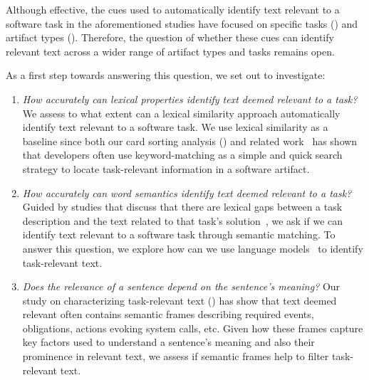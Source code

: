 Although effective, the cues used to automatically identify text relevant to a software task in the aforementioned studies have focused on specific tasks () and artifact types ().
Therefore, the question of whether these cues can identify relevant text across a wider range of artifact types and tasks remains open. 


As a first step towards answering this question, we set out to investigate:


\begin{enumerate}
    \item \textit{How accurately can lexical properties identify text deemed relevant to a task?}
    We assess to what extent can a lexical similarity approach automatically identify text relevant to a software task.
    We use lexical similarity as a baseline since both our card sorting analysis () and related work~\cite{Ko2006a, Freund2015} has shown
    that developers often use keyword-matching as a simple and quick search strategy to locate task-relevant information in a software artifact.


    \item \textit{How accurately can word semantics identify text deemed relevant to a task?}
    Guided by studies that discuss that there are lexical gaps between a task description and the text related to that task's solution~\cite{silva2019, Huang2018, Ye2016},
    we ask if we can identify text relevant to a software task through semantic matching.
    To answer this question, we explore how can we use language models~\cite{Devlin2018Bert, Mikolov2013} to identify  task-relevant text.

    
    \item \textit{Does the relevance of a sentence depend on the sentence's meaning?}
    Our study on characterizing task-relevant text () has show that text deemed relevant often contains semantic frames describing 
     required events, obligations, actions evoking system calls, etc.
    Given how these frames capture key factors used to understand a sentence's meaning
    and also their prominence in relevant text, 
    we assess if semantic frames help to filter task-relevant text.
\end{enumerate}

